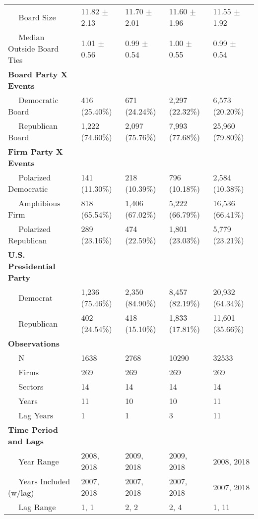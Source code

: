 \begin{tabular}{lllll}
~~ Board Size & 11.82 $\pm$ 2.13 & 11.70 $\pm$ 2.01 & 11.60 $\pm$ 1.96 & 11.55 $\pm$ 1.92\\
~~ Median Outside Board Ties & 1.01 $\pm$ 0.56 & 0.99 $\pm$ 0.54 & 1.00 $\pm$ 0.55 & 0.99 $\pm$ 0.54\\
\bf{Board Party X Events} & ~ & ~ & ~ & ~\\
~~ Democratic Board & 416 (25.40\%) & 671 (24.24\%) & 2,297 (22.32\%) & 6,573 (20.20\%)\\
\addlinespace
~~ Republican Board & 1,222 (74.60\%) & 2,097 (75.76\%) & 7,993 (77.68\%) & 25,960 (79.80\%)\\
\bf{Firm Party X Events} & ~ & ~ & ~ & ~\\
~~ Polarized Democratic & 141 (11.30\%) & 218 (10.39\%) & 796 (10.18\%) & 2,584 (10.38\%)\\
~~ Amphibious Firm & 818 (65.54\%) & 1,406 (67.02\%) & 5,222 (66.79\%) & 16,536 (66.41\%)\\
~~ Polarized Republican & 289 (23.16\%) & 474 (22.59\%) & 1,801 (23.03\%) & 5,779 (23.21\%)\\
\addlinespace
\bf{U.S. Presidential Party} & ~ & ~ & ~ & ~\\
~~ Democrat & 1,236 (75.46\%) & 2,350 (84.90\%) & 8,457 (82.19\%) & 20,932 (64.34\%)\\
~~ Republican & 402 (24.54\%) & 418 (15.10\%) & 1,833 (17.81\%) & 11,601 (35.66\%)\\
\bf{Observations} & ~ & ~ & ~ & ~\\
~~ N & 1638 & 2768 & 10290 & 32533\\
\addlinespace
~~ Firms & 269 & 269 & 269 & 269\\
~~ Sectors & 14 & 14 & 14 & 14\\
~~ Years & 11 & 10 & 10 & 11\\
~~ Lag Years & 1 & 1 & 3 & 11\\
\bf{Time Period and Lags} & ~ & ~ & ~ & ~\\
\addlinespace
~~ Year Range & 2008, 2018 & 2009, 2018 & 2009, 2018 & 2008, 2018\\
~~ Years Included (w/lag) & 2007, 2018 & 2007, 2018 & 2007, 2018 & 2007, 2018\\
~~ Lag Range & 1, 1 & 2, 2 & 2, 4 & 1, 11\\
\bottomrule
\end{tabular}
